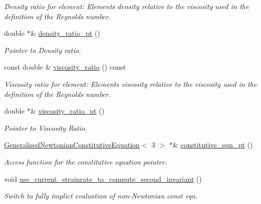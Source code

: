 \begin{DoxyCompactItemize}
\begin{DoxyCompactList}\small\item\em Density ratio for element\+: Element\textquotesingle{}s density relative to the viscosity used in the definition of the Reynolds number. \end{DoxyCompactList}\item 
double $\ast$\& \hyperlink{classoomph_1_1GeneralisedNewtonianAxisymmetricNavierStokesEquations_aae4b90a81f764bfcf3cd43e0bdb901cf}{density\+\_\+ratio\+\_\+pt} ()
\begin{DoxyCompactList}\small\item\em Pointer to Density ratio. \end{DoxyCompactList}\item 
const double \& \hyperlink{classoomph_1_1GeneralisedNewtonianAxisymmetricNavierStokesEquations_a339fb007fec032d84c26e486c436916f}{viscosity\+\_\+ratio} () const
\begin{DoxyCompactList}\small\item\em Viscosity ratio for element\+: Element\textquotesingle{}s viscosity relative to the viscosity used in the definition of the Reynolds number. \end{DoxyCompactList}\item 
double $\ast$\& \hyperlink{classoomph_1_1GeneralisedNewtonianAxisymmetricNavierStokesEquations_aefe866ba2eea920b15e2f508c732f5d2}{viscosity\+\_\+ratio\+\_\+pt} ()
\begin{DoxyCompactList}\small\item\em Pointer to Viscosity Ratio. \end{DoxyCompactList}\item 
\hyperlink{classoomph_1_1GeneralisedNewtonianConstitutiveEquation}{Generalised\+Newtonian\+Constitutive\+Equation}$<$ 3 $>$ $\ast$\& \hyperlink{classoomph_1_1GeneralisedNewtonianAxisymmetricNavierStokesEquations_acb7bc3f563bb60c6920a68a51b33f666}{constitutive\+\_\+eqn\+\_\+pt} ()
\begin{DoxyCompactList}\small\item\em Access function for the constitutive equation pointer. \end{DoxyCompactList}\item 
void \hyperlink{classoomph_1_1GeneralisedNewtonianAxisymmetricNavierStokesEquations_a4f3ab7e517760b8df34abc5fea93a35c}{use\+\_\+current\+\_\+strainrate\+\_\+to\+\_\+compute\+\_\+second\+\_\+invariant} ()
\begin{DoxyCompactList}\small\item\em Switch to fully implict evaluation of non-\/\+Newtonian const eqn. \end{DoxyCompactList}\item 

\end{DoxyCompactItemize}
